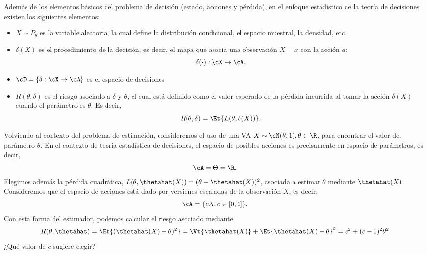 Además de los elementos básicos del problema de decisión (estado, acciones y pérdida), en el enfoque estadístico de la teoría de decisiones existen los siguientes elementos:
\begin{itemize}
	\item $X\sim P_\theta$ es la variable aleatoria, la cual define la distribución condicional, el espacio muestral, la densidad, etc. 
	\item $\delta(X)$ es el procedimiento de la decisión, es decir, el mapa que asocia una observación $X=x$ con la acción $a$:
	\begin{equation}
		\delta(\cdot):\cX\rightarrow\cA.
	\end{equation}
	\item $\cD=\{\delta:\cX\rightarrow\cA\}$ es el espacio de decisiones
	\item $R(\theta,\delta)$ es el riesgo asociado a $\delta$ y $\theta$, el cual está definido como el valor esperado de la pérdida incurrida al tomar la acción $\delta(X)$ cuando el parámetro es $\theta$. Es decir, 
	\begin{equation}
	 	R(\theta,\delta) = \Et{L(\theta,\delta(X))}.
	 \end{equation} 
\end{itemize}


\begin{example}
	Volviendo al contexto del problema de estimación, consideremos el uso de una VA $X\sim\cN(\theta,1), \theta\in\R$, para encontrar el valor del parámetro $\theta$. En el contexto de teoría estadística de decisiones, el espacio de posibles acciones es precisamente en espacio de parámetros, es decir, 
	\begin{equation}
		\cA = \Theta = \R.
	\end{equation}
	Elegimos además la pérdida cuadrática, $L(\theta,\thetahat(X)) = (\theta-\thetahat(X))^2$, asociada a estimar $\theta$ mediante $\thetahat(X)$. Consideremos que el espacio de acciones está dado por versiones escaladas de la observación $X$, es decir, 
	\begin{equation}
		\cA = \{cX, c\in[0,1]\}.
	\end{equation}
	Con esta forma del estimador, podemos calcular el riesgo asociado mediante  
	\begin{equation}
		R(\theta,\thetahat)= \Et{(\thetahat(X)-\theta)^2} = \Vt{\thetahat(X)} + \Et{\thetahat(X)-\theta}^2 = c^2 + (c-1)^2\theta^2
	\end{equation}
	¿Qué valor de $c$ sugiere elegir?
\end{example}

